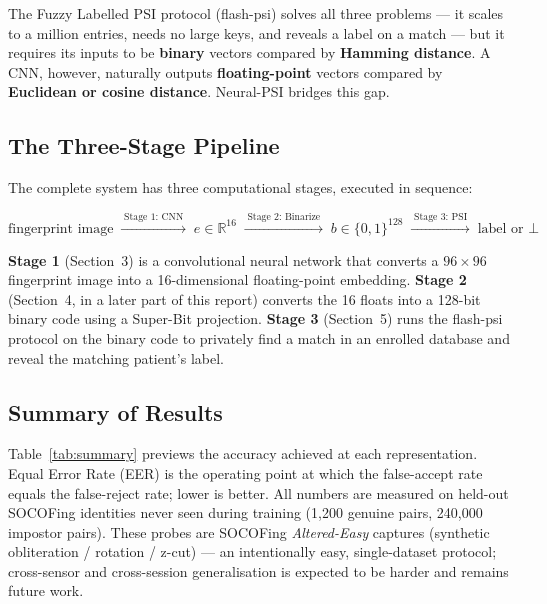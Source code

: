 \documentclass[11pt]{article}
\begin{document}
The Fuzzy Labelled PSI protocol (flash-psi) solves all three problems --- it scales to a
million entries, needs no large keys, and reveals a label on a match --- but it requires
its inputs to be \textbf{binary} vectors compared by \textbf{Hamming distance}. A CNN,
however, naturally outputs \textbf{floating-point} vectors compared by \textbf{Euclidean
or cosine distance}. Neural-PSI bridges this gap.

\subsection{The Three-Stage Pipeline}

The complete system has three computational stages, executed in sequence:

\begin{equation}
\text{fingerprint image} \;\xrightarrow{\;\text{Stage 1: CNN}\;}\;
e \in \mathbb{R}^{16} \;\xrightarrow{\;\text{Stage 2: Binarize}\;}\;
b \in \{0,1\}^{128} \;\xrightarrow{\;\text{Stage 3: PSI}\;}\;
\text{label or } \bot
\end{equation}

\textbf{Stage 1} (Section~3) is a convolutional neural network that converts a $96\times96$
fingerprint image into a 16-dimensional floating-point embedding. \textbf{Stage 2}
(Section~4, in a later part of this report) converts the 16 floats into a 128-bit binary
code using a Super-Bit projection. \textbf{Stage 3} (Section~5) runs the flash-psi protocol
on the binary code to privately find a match in an enrolled database and reveal the
matching patient's label.

\subsection{Summary of Results}

Table~\ref{tab:summary} previews the accuracy achieved at each representation. Equal Error
Rate (EER) is the operating point at which the false-accept rate equals the false-reject
rate; lower is better. All numbers are measured on held-out SOCOFing identities never seen
during training (1{,}200 genuine pairs, 240{,}000 impostor pairs). These probes are SOCOFing
\emph{Altered-Easy} captures (synthetic obliteration / rotation / z-cut) --- an intentionally
easy, single-dataset protocol; cross-sensor and cross-session generalisation is expected to be
harder and remains future work.
\end{document}
